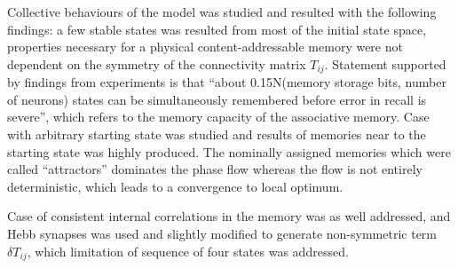 Collective behaviours of the model was studied and resulted with the following findings: a few stable states was resulted from most of the initial state space, properties necessary for a physical content-addressable memory were not dependent on the symmetry of the connectivity matrix $T_{ij}$. Statement supported by findings from experiments is that ``about 0.15N(memory storage bits, number of neurons) states can be simultaneously remembered before error in recall is severe'', which refers to the memory capacity of the associative memory. Case with arbitrary starting state was studied and results of memories near to the starting state was highly produced. The nominally assigned memories which were called ``attractors'' dominates the phase flow whereas the flow is not entirely deterministic, which leads to a convergence to local optimum.

Case of consistent internal correlations in the memory was as well addressed, and Hebb synapses was used and slightly modified to generate non-symmetric term~$\delta T_{ij}$, which limitation of sequence of four states was addressed.
